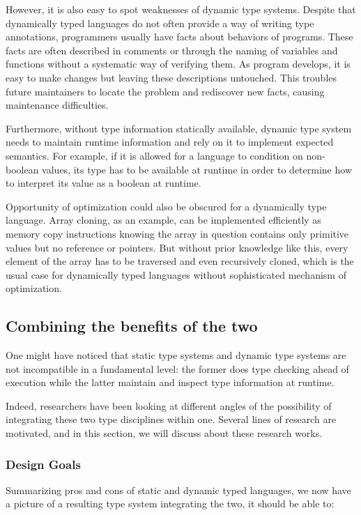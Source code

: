 However, it is also easy to spot weaknesses of dynamic type systems.
Despite that dynamically typed languages do not often provide a way of writing type annotations,
programmers usually have facts about behaviors of programs.
These facts are often described in comments or through the naming of variables and functions without a systematic way of verifying them.
As program develops, it is easy to make changes but leaving these descriptions untouched.
This troubles future maintainers to locate the problem and rediscover new facts,
causing maintenance difficulties.

Furthermore, without type information statically available,
dynamic type system needs to maintain runtime information
and rely on it to implement expected semantics.
For example, if it is allowed for a language to condition on non-boolean values,
its type has to be available at runtime in order to
determine how to interpret its value as a boolean at runtime.

Opportunity of optimization could also be obscured for a dynamically type language.
Array cloning, as an example,
can be implemented efficiently as memory copy instructions
knowing the array in question contains only primitive values but no reference or pointers.
But without prior knowledge like this,
every element of the array has to be traversed and even recursively cloned,
which is the usual case for dynamically typed languages without sophisticated mechanism
of optimization.

\subsection{Combining the benefits of the two}

One might have noticed that static type systems and dynamic type systems
are not incompatible in a fundamental level:
the former does type checking ahead of execution while
the latter maintain and inspect type information at runtime.

Indeed, researchers have been looking at different angles of
the possibility of integrating these two type disciplines within one.
Several lines of research are motivated,
and in this section, we will discuss about these research works.

\subsubsection{Design Goals}

Summarizing pros and cons of static and dynamic typed languages,
we now have a picture of a resulting type system integrating the two,
it should be able to:

